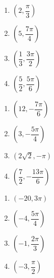 \begin{multicols}{4}

\begin{enumerate}

\item $\left( 2, \dfrac{\pi}{3} \right)$  \label{polarpointgraphfirst}
\item $\left( 5, \dfrac{7\pi}{4} \right)$
\item $\left( \dfrac{1}{3}, \dfrac{3\pi}{2} \right)$
\item $\left( \dfrac{5}{2}, \dfrac{5\pi}{6} \right)$

\setcounter{HW}{\value{enumi}}

\end{enumerate}

\end{multicols}

\begin{multicols}{4} 

\begin{enumerate}

\setcounter{enumi}{\value{HW}}

\item $\left( 12, -\dfrac{7\pi}{6} \right)$
\item $\left( 3, -\dfrac{5\pi}{4} \right)$
\item $\left( 2\sqrt{2}, -\pi \right)$ 
\item $\left( \dfrac{7}{2}, -\dfrac{13\pi}{6} \right)$

\setcounter{HW}{\value{enumi}}

\end{enumerate}

\end{multicols}

\begin{multicols}{4} 

\begin{enumerate}

\setcounter{enumi}{\value{HW}}

\item $\left( -20, 3\pi \right)$ 
\item $\left( -4, \dfrac{5\pi}{4} \right)$
\item $\left( -1, \dfrac{2\pi}{3} \right)$
\item $\left( -3, \dfrac{\pi}{2} \right)$ 

\setcounter{HW}{\value{enumi}}

\end{enumerate}

\end{multicols}

